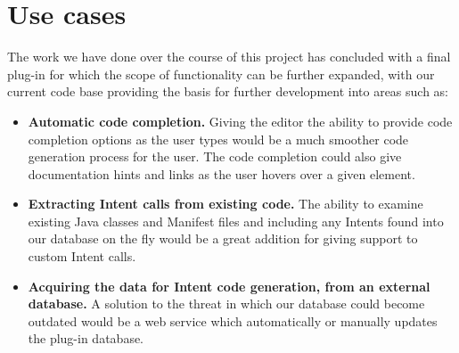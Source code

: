 \section{Use cases}
\label{usecases}

\label{Use cases}
The work we have done over the course of this project has concluded with a final plug-in for which the scope of functionality can be further expanded, with our current code base providing the basis for further development into areas such as:

\begin{itemize}
\item \textbf{Automatic code completion.} Giving the editor the ability to provide code completion options as the user types would be a much smoother code generation process for the user. The code completion could also give documentation hints and links as the user hovers over a given element.
\item \textbf{Extracting Intent calls from existing code.} The ability to examine existing Java classes and Manifest files and including any Intents found into our database on the fly would be a great addition for giving support to custom Intent calls.
\item \textbf{Acquiring the data for Intent code generation, from an external database.} A solution to the threat in which our database could become outdated would be a web service which automatically or manually updates the plug-in database.
\end{itemize}